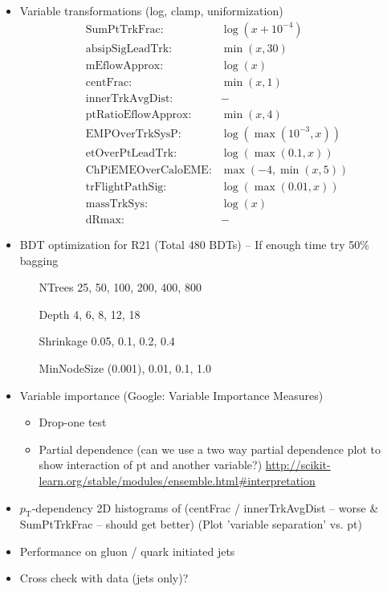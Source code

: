 \begin{itemize}
\item Variable transformations (log, clamp, uniformization)
  \begin{align}
    &\text{SumPtTrkFrac:} &\log(x + 10^{-4}) \\
    &\text{absipSigLeadTrk:} &\min(x, 30) \\
    &\text{mEflowApprox:} &\log(x) \\
    &\text{centFrac:} &\min(x, 1) \\
    &\text{innerTrkAvgDist:} &- \\
    &\text{ptRatioEflowApprox:} &\min(x, 4) \\
    &\text{EMPOverTrkSysP:} &\log(\max(10^{-3}, x)) \\
    &\text{etOverPtLeadTrk:} &\log(\max(0.1, x)) \\
    &\text{ChPiEMEOverCaloEME:} &\max(-4, \min(x, 5)) \\
    &\text{trFlightPathSig:} &\log(\max(0.01, x)) \\
    &\text{massTrkSys:} &\log(x) \\
    &\text{dRmax:} &-
  \end{align}

\item BDT optimization for R21 (Total 480 BDTs) -- If enough time try 50\%
  bagging
  \begin{itemize}
  \item[NTrees] 25, 50, 100, 200, 400, 800
  \item[Depth] 4, 6, 8, 12, 18
  \item[Shrinkage] 0.05, 0.1, 0.2, 0.4
  \item[MinNodeSize] (0.001), 0.01, 0.1, 1.0
  \end{itemize}


\item Variable importance (Google: Variable Importance Measures)
  \begin{itemize}
  \item Drop-one test
  \item Partial dependence (can we use a two way partial dependence plot to
    show interaction of pt and another variable?)
    \url{http://scikit-learn.org/stable/modules/ensemble.html#interpretation}
  \end{itemize}

\item $p_\mathrm{T}$-dependency 2D histograms of (centFrac / innerTrkAvgDist --
  worse \& SumPtTrkFrac -- should get better) (Plot 'variable separation' vs.
  pt)

\item Performance on gluon / quark initiated jets

\item Cross check with data (jets only)?

\end{itemize}

